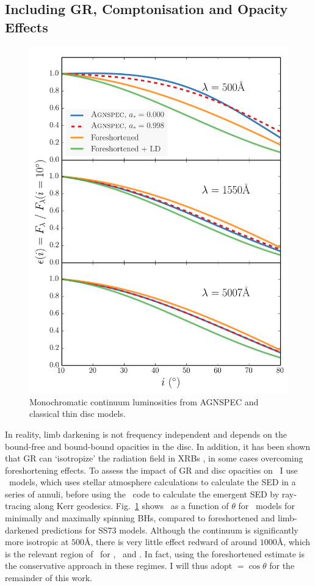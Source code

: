 \subsection{Including GR, Comptonisation and Opacity Effects}

\begin{figure}
\centering
\includegraphics[width=1.0\textwidth]{figures/ewpaper/agnspec.png}
\caption
{
Monochromatic continuum luminosities from AGNSPEC and classical thin disc
models.
}
\label{fig:agnspec_disc}
\end{figure} 


\noindent
In reality, limb darkening is not frequency independent and 
depends on the bound-free and bound-bound opacities in the disc.
In addition, it has been shown that GR can `isotropize' the radiation
field in XRBs \citep{zhang1997,munozdarias2013}, in some cases overcoming
foreshortening effects. To assess the impact of GR and disc opacities
on \ept\ I use \agn\ models, which uses stellar atmosphere 
calculations to calculate the 
SED in a series of annuli, before using the \kerrtrans\ code 
to calculate the emergent SED by ray-tracing along Kerr geodesics.
Fig.~\ref{fig:agnspec_disc} shows \ept\ as a function of 
$\theta$ for \agn\ models for minimally and maximally spinning BHs,
compared to foreshortened and limb-darkened predictions for SS73 models.
Although the continuum is significantly more isotropic at $500$\AA,
there is very little effect redward of around $1000$\AA, which is the relevant
region of \ept\ for \oiiifull, \civline\ and \mgline . 
In fact, using the foreshortened estimate is 
the conservative approach in these regimes. I will thus adopt \ept$=\cos \theta$
for the remainder of this work.


